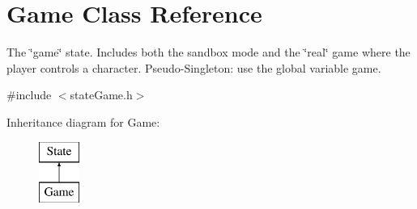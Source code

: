 \hypertarget{classGame}{
\section{\-Game \-Class \-Reference}
\label{d9/d68/classGame}
}


\-The \char`\"{}game\char`\"{} state. \-Includes both the sandbox mode and the \char`\"{}real\char`\"{} game where the player controls a character. \-Pseudo-\/\-Singleton\-: use the global variable game.  




{\ttfamily \#include $<$state\-Game.\-h$>$}

\-Inheritance diagram for \-Game\-:\begin{figure}[H]
\begin{center}
\leavevmode
\includegraphics[height=2.000000cm]{d9/d68/classGame}
\end{center}
\end{figure}
